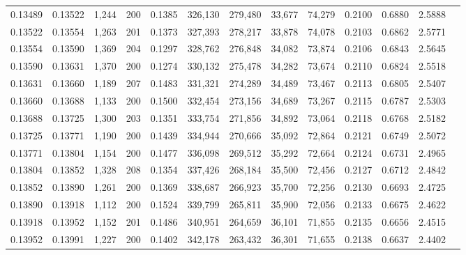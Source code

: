 \begin{tabular}{rrrrrrrrrrrrr}
0.13489 & 0.13522 & 1,244 & 200 &                                     0.1385 & 326,130 & 279,480 &  33,677 &  74,279 & 0.2100 & 0.6880 & 2.5888 \\
0.13522 & 0.13554 & 1,263 & 201 &                                     0.1373 & 327,393 & 278,217 &  33,878 &  74,078 & 0.2103 & 0.6862 & 2.5771 \\
0.13554 & 0.13590 & 1,369 & 204 &                                     0.1297 & 328,762 & 276,848 &  34,082 &  73,874 & 0.2106 & 0.6843 & 2.5645 \\
0.13590 & 0.13631 & 1,370 & 200 &                                     0.1274 & 330,132 & 275,478 &  34,282 &  73,674 & 0.2110 & 0.6824 & 2.5518 \\
0.13631 & 0.13660 & 1,189 & 207 &                                     0.1483 & 331,321 & 274,289 &  34,489 &  73,467 & 0.2113 & 0.6805 & 2.5407 \\
0.13660 & 0.13688 & 1,133 & 200 &                                     0.1500 & 332,454 & 273,156 &  34,689 &  73,267 & 0.2115 & 0.6787 & 2.5303 \\
0.13688 & 0.13725 & 1,300 & 203 &                                     0.1351 & 333,754 & 271,856 &  34,892 &  73,064 & 0.2118 & 0.6768 & 2.5182 \\
0.13725 & 0.13771 & 1,190 & 200 &                                     0.1439 & 334,944 & 270,666 &  35,092 &  72,864 & 0.2121 & 0.6749 & 2.5072 \\
0.13771 & 0.13804 & 1,154 & 200 &                                     0.1477 & 336,098 & 269,512 &  35,292 &  72,664 & 0.2124 & 0.6731 & 2.4965 \\
0.13804 & 0.13852 & 1,328 & 208 &                                     0.1354 & 337,426 & 268,184 &  35,500 &  72,456 & 0.2127 & 0.6712 & 2.4842 \\
0.13852 & 0.13890 & 1,261 & 200 &                                     0.1369 & 338,687 & 266,923 &  35,700 &  72,256 & 0.2130 & 0.6693 & 2.4725 \\
0.13890 & 0.13918 & 1,112 & 200 &                                     0.1524 & 339,799 & 265,811 &  35,900 &  72,056 & 0.2133 & 0.6675 & 2.4622 \\
0.13918 & 0.13952 & 1,152 & 201 &                                     0.1486 & 340,951 & 264,659 &  36,101 &  71,855 & 0.2135 & 0.6656 & 2.4515 \\
0.13952 & 0.13991 & 1,227 & 200 &                                     0.1402 & 342,178 & 263,432 &  36,301 &  71,655 & 0.2138 & 0.6637 & 2.4402 \\

\end{tabular}
